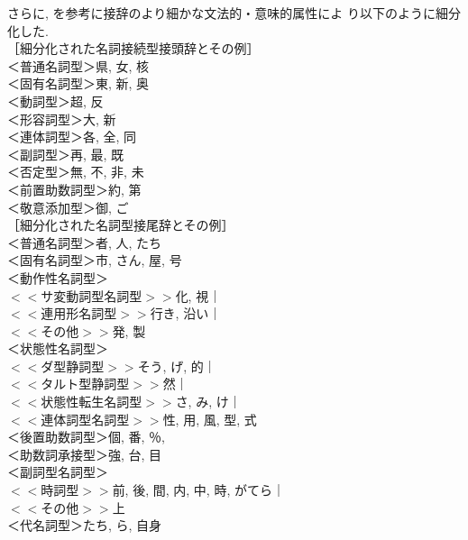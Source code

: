  さらに, \cite{Nomura1978} を参考に接辞のより細かな文法的・意味的属性によ
り以下のように細分化した. \\
［細分化された名詞接続型接頭辞とその例］\\
＜普通名詞型＞県, 女, 核\\
＜固有名詞型＞東, 新, 奥\\
＜動詞型＞超, 反\\
＜形容詞型＞大, 新\\
＜連体詞型＞各, 全, 同\\
＜副詞型＞再, 最, 既\\
＜否定型＞無, 不, 非, 未\\
＜前置助数詞型＞約, 第\\
＜敬意添加型＞御, ご\\
［細分化された名詞型接尾辞とその例］\\
＜普通名詞型＞者, 人, たち\\
＜固有名詞型＞市, さん, 屋, 号\\
＜動作性名詞型＞\\
\hspace*{3.5mm} \(<<\)サ変動詞型名詞型\(>>\)化, 視｜\\
\hspace*{3.5mm} \(<<\)連用形名詞型\(>>\)行き, 沿い｜\\
\hspace*{3.5mm} \(<<\)その他\(>>\)発, 製\\＜状態性名詞型＞\\
\hspace*{3.5mm} \(<<\)ダ型静詞型\(>>\)そう, げ, 的｜\\
\hspace*{3.5mm} \(<<\)タルト型静詞型\(>>\)然｜\\
\hspace*{3.5mm} \(<<\)状態性転生名詞型\(>>\)さ, み, け｜\\
\hspace*{3.5mm} \(<<\)連体詞型名詞型\(>>\)性, 用, 風, 型, 式\\
＜後置助数詞型＞個, 番, ％, \\
＜助数詞承接型＞強, 台, 目\\
＜副詞型名詞型＞\\
\hspace*{3.5mm} \(<<\)時詞型\(>>\)前, 後, 間, 内, 中, 時, がてら｜\\
\hspace*{3.5mm} \(<<\)その他\(>>\)上\\
＜代名詞型＞たち, ら, 自身\\
